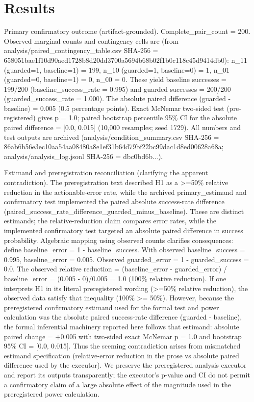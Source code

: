 \documentclass[conference]{IEEEtran}
\begin{document}
\section{Results}
Primary confirmatory outcome (artifact-grounded). Complete\_pair\_count = 200. Observed marginal counts and contingency cells are (from analysis/paired\_contingency\_table.csv SHA-256 = 658051bae1f10d90aed1728b8d20dd3700a5694b68b02f1b0c118c45d9414db0): n\_11 (guarded=1, baseline=1) = 199, n\_10 (guarded=1, baseline=0) = 1, n\_01 (guarded=0, baseline=1) = 0, n\_00 = 0. These yield baseline successes = 199/200 (baseline\_success\_rate = 0.995) and guarded successes = 200/200 (guarded\_success\_rate = 1.000). The absolute paired difference (guarded - baseline) = 0.005 (0.5 percentage points). Exact McNemar two-sided test (pre-registered) gives p = 1.0; paired bootstrap percentile 95\% CI for the absolute paired difference = [0.0, 0.015] (10,000 resamples; seed 1729). All numbers and test outputs are archived (analysis/condition\_summary.csv SHA-256 = 86ab6b56e3ec10aa54aa08480a8e1ef31b64d79bf22bc99dac1d8ed00628a68a; analysis/analysis\_log.jsonl SHA-256 = dbc0bd6b...).

Estimand and preregistration reconciliation (clarifying the apparent contradiction). The preregistration text described H1 as a >=50\% relative reduction in the actionable-error rate, while the archived primary\_estimand and confirmatory test implemented the paired absolute success-rate difference (paired\_success\_rate\_difference\_guarded\_minus\_baseline). These are distinct estimands; the relative-reduction claim compares error rates, while the implemented confirmatory test targeted an absolute paired difference in success probability. Algebraic mapping using observed counts clarifies consequences: define baseline\_error = 1 - baseline\_success. With observed baseline\_success = 0.995, baseline\_error = 0.005. Observed guarded\_error = 1 - guarded\_success = 0.0. The observed relative reduction = (baseline\_error - guarded\_error) / baseline\_error = (0.005 - 0)/0.005 = 1.0 (100\% relative reduction). If one interprets H1 in its literal preregistered wording (>=50\% relative reduction), the observed data satisfy that inequality (100\% >= 50\%). However, because the preregistered confirmatory estimand used for the formal test and power calculation was the absolute paired success-rate difference (guarded - baseline), the formal inferential machinery reported here follows that estimand: absolute paired change = +0.005 with two-sided exact McNemar p = 1.0 and bootstrap 95\% CI = [0.0, 0.015]. Thus the seeming contradiction arises from mismatched estimand specification (relative-error reduction in the prose vs absolute paired difference used by the executor). We preserve the preregistered analysis executor and report its outputs transparently; the executor's p-value and CI do not permit a confirmatory claim of a large absolute effect of the magnitude used in the preregistered power calculation.
\end{document}
